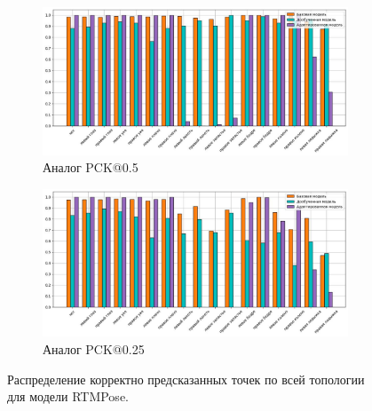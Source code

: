 \begin{figure}[H]
\centering
\begin{subfigure}{.8\textwidth}
	\centering
	\includegraphics[width=\textwidth]{./images/results/rtmpose/rtmpose_05_s}
	\caption{Аналог PCK@0.5}
	\label{fig:rtmpose_distr_05}
\end{subfigure}
\begin{subfigure}{.8\textwidth}
	\centering
	\includegraphics[width=\textwidth]{./images/results/rtmpose/rtmpose_025_s}
	\caption{Аналог PCK@0.25}
	\label{fig:rtmpose_distr_025}
\end{subfigure}
\caption{Распределение корректно предсказанных точек по всей топологии для модели RTMPose.}
\label{fig:rtmpose_distr}
\end{figure}

\newpage